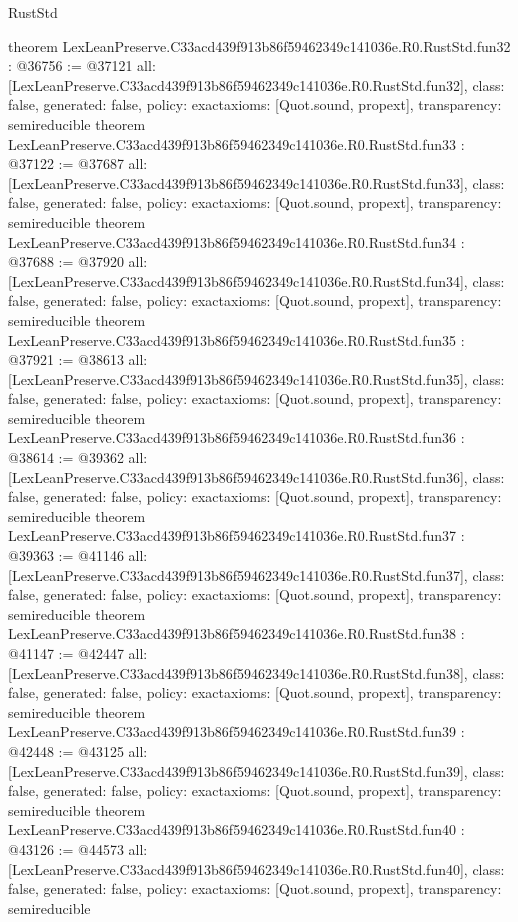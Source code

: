\begin{lexlean}{RustStd}
\begin{coremodule}
{}
theorem LexLeanPreserve.C33acd439f913b86f59462349c141036e.R0.RustStd.fun32 : @36756 := @37121 {
  all: [LexLeanPreserve.C33acd439f913b86f59462349c141036e.R0.RustStd.fun32],
  class: false,
  generated: false,
  policy: exact{axioms: [Quot.sound, propext]},
  transparency: semireducible
}
theorem LexLeanPreserve.C33acd439f913b86f59462349c141036e.R0.RustStd.fun33 : @37122 := @37687 {
  all: [LexLeanPreserve.C33acd439f913b86f59462349c141036e.R0.RustStd.fun33],
  class: false,
  generated: false,
  policy: exact{axioms: [Quot.sound, propext]},
  transparency: semireducible
}
theorem LexLeanPreserve.C33acd439f913b86f59462349c141036e.R0.RustStd.fun34 : @37688 := @37920 {
  all: [LexLeanPreserve.C33acd439f913b86f59462349c141036e.R0.RustStd.fun34],
  class: false,
  generated: false,
  policy: exact{axioms: [Quot.sound, propext]},
  transparency: semireducible
}
theorem LexLeanPreserve.C33acd439f913b86f59462349c141036e.R0.RustStd.fun35 : @37921 := @38613 {
  all: [LexLeanPreserve.C33acd439f913b86f59462349c141036e.R0.RustStd.fun35],
  class: false,
  generated: false,
  policy: exact{axioms: [Quot.sound, propext]},
  transparency: semireducible
}
theorem LexLeanPreserve.C33acd439f913b86f59462349c141036e.R0.RustStd.fun36 : @38614 := @39362 {
  all: [LexLeanPreserve.C33acd439f913b86f59462349c141036e.R0.RustStd.fun36],
  class: false,
  generated: false,
  policy: exact{axioms: [Quot.sound, propext]},
  transparency: semireducible
}
theorem LexLeanPreserve.C33acd439f913b86f59462349c141036e.R0.RustStd.fun37 : @39363 := @41146 {
  all: [LexLeanPreserve.C33acd439f913b86f59462349c141036e.R0.RustStd.fun37],
  class: false,
  generated: false,
  policy: exact{axioms: [Quot.sound, propext]},
  transparency: semireducible
}
theorem LexLeanPreserve.C33acd439f913b86f59462349c141036e.R0.RustStd.fun38 : @41147 := @42447 {
  all: [LexLeanPreserve.C33acd439f913b86f59462349c141036e.R0.RustStd.fun38],
  class: false,
  generated: false,
  policy: exact{axioms: [Quot.sound, propext]},
  transparency: semireducible
}
theorem LexLeanPreserve.C33acd439f913b86f59462349c141036e.R0.RustStd.fun39 : @42448 := @43125 {
  all: [LexLeanPreserve.C33acd439f913b86f59462349c141036e.R0.RustStd.fun39],
  class: false,
  generated: false,
  policy: exact{axioms: [Quot.sound, propext]},
  transparency: semireducible
}
theorem LexLeanPreserve.C33acd439f913b86f59462349c141036e.R0.RustStd.fun40 : @43126 := @44573 {
  all: [LexLeanPreserve.C33acd439f913b86f59462349c141036e.R0.RustStd.fun40],
  class: false,
  generated: false,
  policy: exact{axioms: [Quot.sound, propext]},
  transparency: semireducible
}
\end{coremodule}
\end{lexlean}
